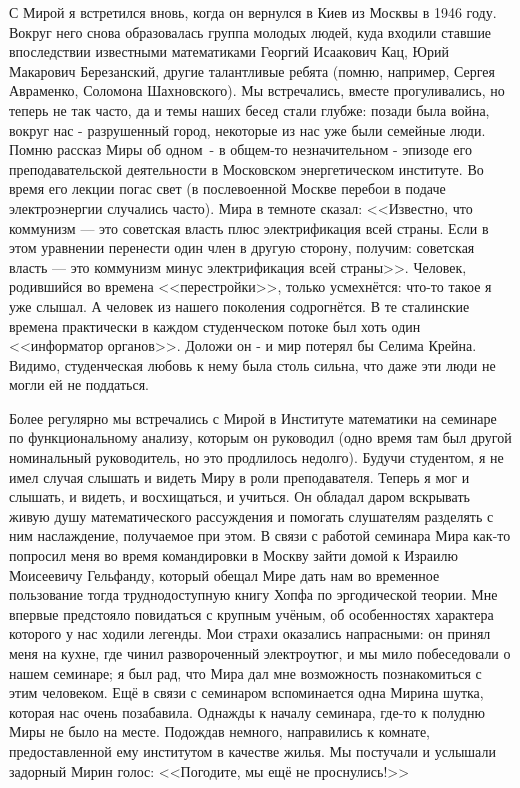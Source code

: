 С Мирой я встретился вновь, когда он вернулся в Киев из Москвы в 1946 году. Вокруг него снова образовалась группа молодых людей, куда входили ставшие впоследствии известными математиками Георгий Исаакович Кац, Юрий Макарович Березанский, другие талантливые ребята (помню, например, Сергея Авраменко, Соломона Шахновского). Мы встречались, вместе прогуливались, но теперь не так часто, да и темы наших бесед стали глубже: позади была война, вокруг нас - разрушенный город, некоторые из нас уже были семейные люди. Помню рассказ Миры об одном~- в общем-то незначительном - эпизоде его преподавательской деятельности в Московском энергетическом институте. Во время его лекции погас свет (в послевоенной Москве перебои в подаче электроэнергии случались часто). Мира в темноте сказал: <<Известно, что коммунизм --- это советская власть плюс электрификация всей страны. Если в этом уравнении перенести один член в другую сторону, получим: советская власть --- это коммунизм минус электрификация всей страны>>. Человек, родившийся во времена <<перестройки>>, только усмехнётся: что-то такое я уже слышал. А человек из нашего поколения содрогнётся. В те сталинские времена практически в каждом студенческом потоке был хоть один <<информатор органов>>. Доложи он - и мир потерял бы Селима Крейна. Видимо, студенческая любовь к нему была столь сильна, что даже эти люди не могли ей не поддаться.

Более регулярно мы встречались с Мирой в Институте математики на семинаре по функциональному анализу, которым он руководил (одно время там был другой номинальный руководитель, но это продлилось недолго). Будучи студентом, я не имел случая слышать и видеть Миру в роли преподавателя. Теперь я мог и слышать, и видеть, и восхищаться, и учиться. Он обладал даром вскрывать живую душу математического рассуждения и помогать слушателям разделять с ним наслаждение, получаемое при этом. В связи с работой семинара Мира как-то попросил меня во время командировки в Москву зайти домой к Израилю Моисеевичу Гельфанду, который обещал Мире дать нам во временное пользование тогда труднодоступную книгу Хопфа по эргодической теории. Мне впервые предстояло повидаться с крупным учёным, об особенностях характера которого у нас ходили легенды. Мои страхи оказались напрасными: он принял меня на кухне, где чинил развороченный электроутюг, и мы мило побеседовали о нашем семинаре; я был рад, что Мира дал мне возможность познакомиться с этим человеком. Ещё в связи с семинаром вспоминается одна Мирина шутка, которая нас очень позабавила. Однажды к началу семинара, где-то к полудню Миры не было на месте. Подождав немного, направились к комнате, предоставленной ему институтом в качестве жилья. Мы постучали и услышали задорный Мирин голос: <<Погодите, мы ещё не проснулись!>>


